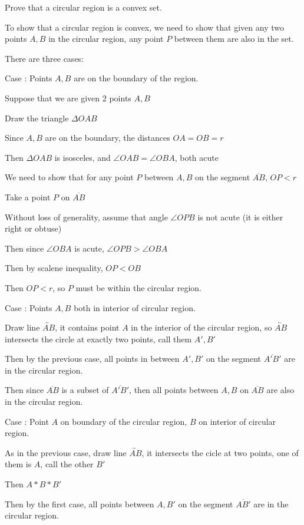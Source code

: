 \documentclass[11pt]{article}
\newcommand{\lines}[1]{\overleftrightarrow{#1}}
\newcommand{\segment}[1]{\overline{#1}}
\begin{document}
\begin{itemize}
		Prove that a circular region is a convex set. 

		To show that a circular region is convex, we need to show that given any two points $A, B$ in the circular region, any point $P$ between them are also in the set.

		There are three cases: 

		Case : Points $A,B$ are on the boundary of the region.

		Suppose that we are given 2 points $A,B$

		Draw the triangle $\Delta OAB$

		Since $A,B$ are on the boundary, the distances $OA = OB = r$

		Then $\Delta OAB$ is isosceles, and $\angle OAB = \angle OBA$, both acute

		We need to show that for any point $P$ between $A,B$ on the segment $\segment{AB}$, $OP < r$

		Take a point $P$ on $\segment{AB}$

		Without loss of generality, assume that angle $\angle OPB$ is not acute (it is either right or obtuse)

		Then since $\angle OBA$ is acute, $\angle OPB > \angle OBA$

		Then by scalene inequality, $OP < OB$

		Then $OP < r$, so $P$ must be within the circular region.

		Case : Points $A,B$ both in interior of circular region.

		Draw line $\lines{AB}$, it contains point $A$ in the interior of the circular region, so $\lines{AB}$ intersects the circle at exactly two points, call them $A', B'$

		Then by the previous case, all points in between $A', B'$ on the segment $\segment{A'B'}$ are in the circular region.

		Then since $\segment{AB}$ is a subset of $\segment{A'B'}$, then all points between $A,B$ on $\segment{AB}$ are also in the circular region.

		Case : Point $A$ on boundary of the circular region, $B$ on interior of circular region.

		As in the previous case, draw line $\lines{AB}$, it intersects the cicle at two points, one of them is $A$, call the other $B'$

		Then $A * B * B'$

		Then by the first case, all points between $A, B'$ on the segment $\segment{AB'}$ are in the circular region.


\end{itemize}
\end{document}
